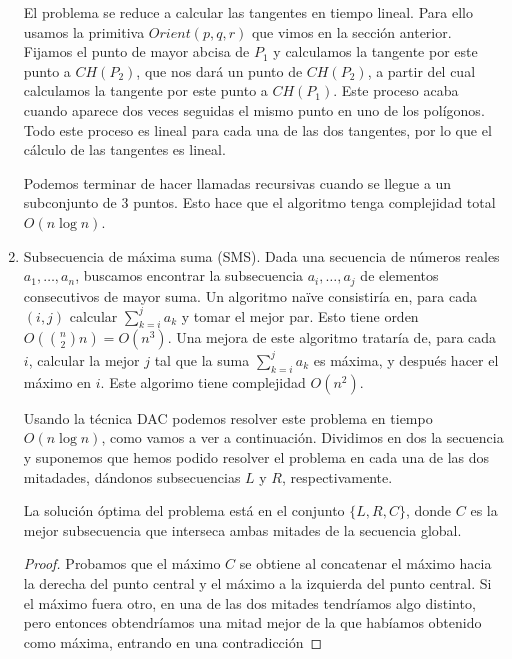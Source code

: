 \documentclass[AL.tex]{subfiles}
\begin{document}
\begin{ejs}
\begin{enumerate}

El problema se reduce a calcular las tangentes en tiempo lineal. Para ello usamos la primitiva $Orient(p,q,r)$ que vimos en la sección anterior. Fijamos el punto de mayor abcisa de $P_1$ y calculamos la tangente por este punto a $CH(P_2)$, que nos dará un punto de $CH(P_2)$, a partir del cual calculamos la tangente por este punto a $CH(P_1)$. Este proceso acaba cuando aparece dos veces seguidas el mismo punto en uno de los polígonos. Todo este proceso es lineal para cada una de las dos tangentes, por lo que el cálculo de las tangentes es lineal.

Podemos terminar de hacer llamadas recursivas cuando se llegue a un subconjunto de 3 puntos. Esto hace que el algoritmo tenga complejidad total $O(n\log n)$.  


\item Subsecuencia de máxima suma (SMS). Dada una secuencia de números reales $a_1,\dots, a_n$, buscamos encontrar la subsecuencia $a_i,\dots, a_j$ de elementos consecutivos de mayor suma. Un algoritmo naïve consistiría en, para cada $(i,j)$ calcular $\sum_{k=i}^ja_k$ y tomar el mejor par. Esto tiene orden $O(\binom{n}{2}n)=O(n^3)$. Una mejora de este algoritmo trataría de, para cada $i$, calcular la mejor $j$ tal que la suma $\sum_{k=i}^ja_k$ es máxima, y después hacer el máximo en $i$. Este algorimo tiene complejidad $O(n^2)$. 

Usando la técnica DAC podemos resolver este problema en tiempo $O(n\log n)$, como vamos a ver a continuación. Dividimos en dos la secuencia y suponemos que hemos podido resolver el problema en cada una de las dos mitadades, dándonos subsecuencias $L$ y $R$, respectivamente. 
\begin{lemma}
La solución óptima del problema está en el conjunto $\{L,R,C\}$, donde $C$ es la mejor subsecuencia que interseca ambas mitades de la secuencia global. 
\end{lemma}
\begin{proof}
Probamos que el máximo $C$ se obtiene al concatenar el máximo hacia la derecha del punto central y el máximo a la izquierda del punto central. Si el máximo fuera otro, en una de las dos mitades tendríamos algo distinto, pero entonces obtendríamos una mitad mejor de la que habíamos obtenido como máxima, entrando en una contradicción 


\end{proof}
\end{enumerate}
\end{ejs}
\end{document}
